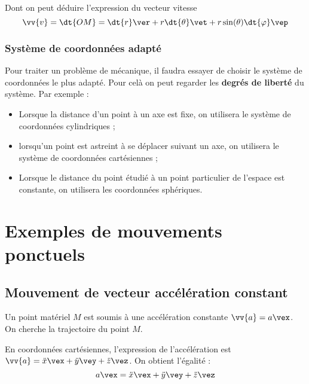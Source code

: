 \documentclass{cours}
\begin{document}
Dont on peut déduire l'expression du vecteur vitesse  
\begin{equation}
  \vv{v} = \dt{OM} = \dt{r}\ver + r\dt{\theta} \vet + r\sin(\theta)\dt{\varphi}\vep
\end{equation}

\subsubsection{Système de coordonnées adapté}%
\label{ssub:systeme_de_coordonnees_adapte}
Pour traiter un problème de mécanique, il faudra essayer de choisir le système de coordonnées le plus adapté. Pour celà on peut regarder les \textbf{degrés de liberté} du système. Par exemple :

\begin{itemize}
  \item Lorsque la distance d'un point à un axe est fixe, on utilisera le système de coordonnées cylindriques ;
  \item lorsqu'un point est astreint à se déplacer suivant un axe, on utilisera le système de coordonnées cartésiennes ;
  \item Lorsque le distance du point étudié à un point particulier de l'espace est constante, on utilisera les coordonnées sphériques.
\end{itemize}


\section{Exemples de mouvements ponctuels}%
\label{sub:exemples_de_mouvements_ponctuels}

\subsection{Mouvement de vecteur accélération constant}%
\label{ssub:mouvement_de_vecteur_acceleration_constant}
Un point matériel $M$ est soumis à une accélération constante $\vv{a} = a\vex$. On cherche la trajectoire du point $M$.

En coordonnées cartésiennes, l'expression de l'accélération est $\vv{a} = \ddot{x}\vex + \ddot{y}\vey +\ddot{z}\vez$. On obtient l'égalité :
\begin{equation}
a \vex  = \ddot{x}\vex + \ddot{y}\vey +\ddot{z}\vez
\end{equation}
\end{document}
